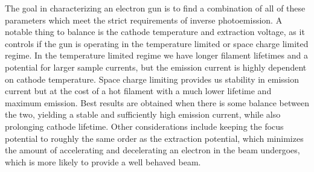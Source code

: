 The goal in characterizing an electron gun is to find a combination of all of these parameters which meet the strict requirements of inverse 
photoemission. A notable thing to balance is the cathode temperature and extraction voltage, as it controls if the gun is operating in the temperature limited 
or space charge limited regime. In the temperature limited regime we have longer filament lifetimes and a potential for larger sample currents, but 
the emission current is highly dependent on cathode temperature. Space charge limiting provides us stability in emission current but at the cost of 
a hot filament with a much lower lifetime and maximum emission. Best results are obtained when there is some balance between the two, yielding a stable and sufficiently high 
emission current, while also prolonging cathode lifetime\cite{stoffel1985low,staib}. Other considerations include keeping the focus potential to roughly the same order as the extraction 
potential, which minimizes the amount of accelerating and decelerating an electron in the beam undergoes, which is more likely to provide a well 
behaved beam\cite{stoffel1985low,raj2004optimization}.